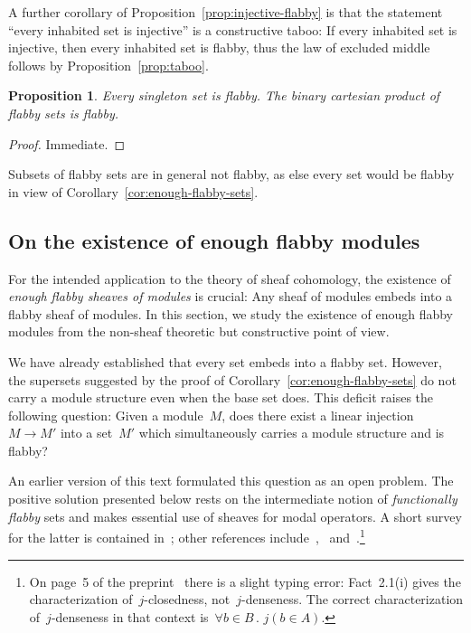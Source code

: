 \documentclass[oneside]{amsart}
\theoremstyle{definition}
\theoremstyle{plain}
\newtheorem{prop}[defn]{Proposition}
\theoremstyle{remark}
\renewcommand{\_}{\mathpunct{.}\,}
\begin{document}
A further corollary of Proposition~\ref{prop:injective-flabby} is that the
statement ``every inhabited set is injective'' is a constructive taboo: If every
inhabited set is injective, then every inhabited set is flabby, thus the law of
excluded middle follows by Proposition~\ref{prop:taboo}.

\begin{prop}Every singleton set is flabby. The binary cartesian product of flabby sets
is flabby.\end{prop}

\begin{proof}Immediate.\end{proof}

Subsets of flabby sets are in general not flabby, as else every set would be
flabby in view of Corollary~\ref{cor:enough-flabby-sets}.


\subsection{On the existence of enough flabby modules}

For the intended application to the theory of sheaf cohomology, the existence
of \emph{enough flabby sheaves of modules} is crucial: Any sheaf of modules
embeds into a flabby sheaf of modules. In this section, we study the existence
of enough flabby modules from the non-sheaf theoretic but constructive point of
view.

We have already established that every set embeds into a flabby set. However,
the supersets suggested by the proof of Corollary~\ref{cor:enough-flabby-sets}
do not carry a module structure even when the base set does. This deficit
raises the following question: Given a module~$M$, does there exist a linear
injection~$M \to M'$ into a set~$M'$ which simultaneously carries a module
structure and is flabby?

An earlier version of this text formulated this question as an open problem.
The positive solution presented below rests on the intermediate notion of
\emph{functionally flabby} sets and makes essential use of sheaves for modal
operators. A short survey for the latter is contained
in~\cite[Section~6]{blechschmidt:phd}; other references
include~\cite[Sections~14.4f.]{goldblatt:topoi},~\cite{goldblatt:modality}
\cite{vries:sheafification} and~\cite{fourman-scott:sheaves-and-logic}.\footnote{On page~5 of the
preprint~\cite{vries:sheafification} there is a slight typing error:
Fact~2.1(i) gives the characterization of~$j$-closedness, not~$j$-denseness.
The correct characterization of~$j$-denseness in that context is~$\forall b \in
B\_ j(b \in A)$.}
\end{document}
